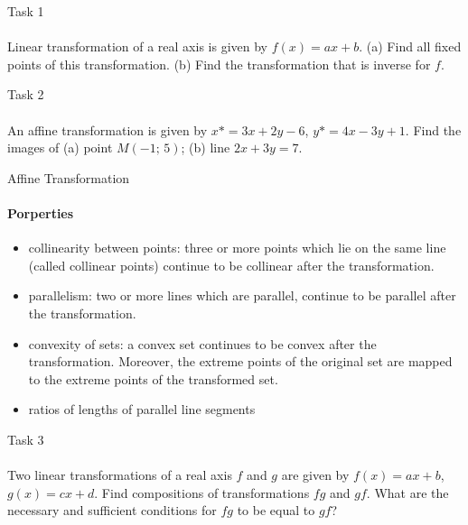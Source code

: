 \documentclass[aspectratio=169]{beamer}
\begin{document}
\begin{frame}[t]{Task 1}
    \framesubtitle{}
    Linear transformation of a real axis is given by $f(x)=ax+b$. (a) Find all fixed points of this transformation. (b) Find the transformation that is inverse for $f$.

\end{frame}

\begin{frame}[t]{Task 2}
    \framesubtitle{}
    An affine transformation is given by $x*=3x+2y-6$, $y*=4x-3y+1$. Find the images of (a) point $M(-1;\,5)$; (b) line $2x+3y=7$.

\end{frame}


\begin{frame}[t]{Affine Transformation}
\framesubtitle{Porperties}
    \begin{itemize}
        \item collinearity between points: three or more points which lie on the same line (called collinear points) continue to be collinear after the transformation.
        \item parallelism: two or more lines which are parallel, continue to be parallel after the transformation.
        \item convexity of sets: a convex set continues to be convex after the transformation. Moreover, the extreme points of the original set are mapped to the extreme points of the transformed set.
        \item ratios of lengths of parallel line segments
    \end{itemize}
\end{frame}

\begin{frame}[t]{Task 3}
    \framesubtitle{}
    Two linear transformations of a real axis $f$ and $g$ are given by $f(x)=ax+b$, $g(x)=cx+d$. Find compositions of transformations $fg$ and $gf$. What are the necessary and sufficient conditions for $fg$ to be equal to $gf$?
    
\end{frame}
\end{document}
